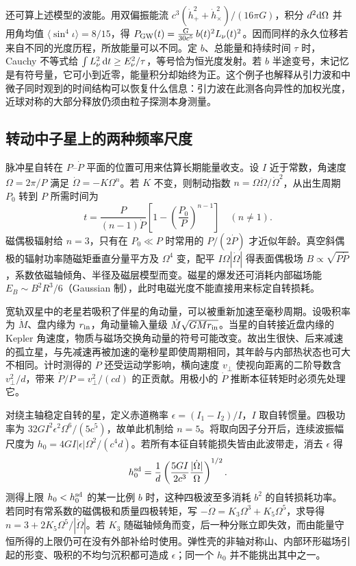 还可算上述模型的波能。用双偏振能流 $c^3(\dot h_+^2+\dot h_\times^2)/(16\pi G)$，积分 $d^2\dd\Omega$ 并用角均值 $\langle\sin^4\iota\rangle=8/15$，得 $P_{\rm GW}(t)=\frac{G}{30c^5}\, b(t)^2L_\nu(t)^2$。因而同样的永久位移若来自不同的光度历程，所放能量可以不同。定 $b$、总能量和持续时间 $\tau$ 时，Cauchy 不等式给 $\int L_\nu^2\,\dd t\ge E_\nu^2/\tau$，等号恰为恒光度发射。若 $b$ 半途变号，末记忆是有符号量，它可小到近零，能量积分却始终为正。这个例子也解释从引力波和中微子同时观到的时间结构可以恢复什么信息：引力波在此测各向异性的加权光度，近球对称的大部分释放仍须由粒子探测本身测量。

\subsection{转动中子星上的两种频率尺度}

脉冲星自转在 $P$--$\dot P$ 平面的位置可用来估算长期能量收支。设 $I$ 近于常数，角速度 $\Omega=2\pi/P$ 满足 $\dot\Omega=-K\Omega^n$。若 $K$ 不变，则制动指数 $n=\Omega\ddot\Omega/\dot\Omega^2$，从出生周期 $P_0$ 转到 $P$ 所需时间为
\[
 t=\frac{P}{(n-1)\dot P}
       \left[1-\left(\frac{P_0}{P}\right)^{n-1}\right]\quad(n\ne1).
\]
磁偶极辐射给 $n=3$，只有在 $P_0\ll P$ 时常用的 $P/(2\dot P)$ 才近似年龄。真空斜偶极的辐射功率随磁矩垂直分量平方及 $\Omega^4$ 变，配平 $I\Omega|\dot\Omega|$ 得表面偶极场 $B\propto\sqrt{P\dot P}$，系数依磁轴倾角、半径及磁层模型而变。磁星的爆发还可消耗内部磁场能 $E_B\sim B^2R^3/6$（Gaussian 制），此时电磁光度不能直接用来标定自转损耗。

宽轨双星中的老星若吸积了伴星的角动量，可以被重新加速至毫秒周期。设吸积率为 $\dot M$、盘内缘为 $r_{\rm in}$，角动量输入量级 $\dot M\sqrt{GMr_{\rm in}}$。当星的自转接近盘内缘的 Kepler 角速度，物质与磁场交换角动量的符号可能改变。故出生很快、后来减速的孤立星，与先减速再被加速的毫秒星即使周期相同，其年龄与内部热状态也可大不相同。计时测得的 $\dot P$ 还受运动学影响，横向速度 $v_\perp$ 使视向距离的二阶导数含 $v_\perp^2/d$，带来 $\dot P/P=v_\perp^2/(cd)$ 的正贡献。用极小的 $\dot P$ 推断本征转矩时必须先处理它。

对绕主轴稳定自转的星，定义赤道椭率 $\epsilon=(I_1-I_2)/I$，$I$ 取自转惯量。四极功率为 $32 G I^2\epsilon^2\Omega^6/(5c^5)$，故单此机制给 $n=5$。将取向因子分开后，连续波振幅尺度为 $h_0=4GI|\epsilon|\Omega^2/(c^4d)$。若所有本征自转能损失皆由此波带走，消去 $\epsilon$ 得
\begin{equation}
 h_0^{\rm sd}=\frac1d\left(\frac{5GI}{2c^3}
                      \frac{|\dot\Omega|}{\Omega}\right)^{1/2}.
 \label{eq:gw-csd}
\end{equation}
测得上限 $h_0<h_0^{\rm sd}$ 的某一比例 $b$ 时，这种四极波至多消耗 $b^2$ 的自转损耗功率。若同时有常系数的磁偶极和质量四极转矩，写 $-\dot\Omega=K_3\Omega^3+K_5\Omega^5$，求导得 $n=3+2K_5\Omega^5/|\dot\Omega|$。若 $K_3$ 随磁轴倾角而变，后一种分账立即失效，而由能量守恒所得的上限仍可在没有外部补给时使用。弹性壳的非轴对称山、内部环形磁场引起的形变、吸积的不均匀沉积都可造成 $\epsilon$；同一个 $h_0$ 并不能挑出其中之一。




